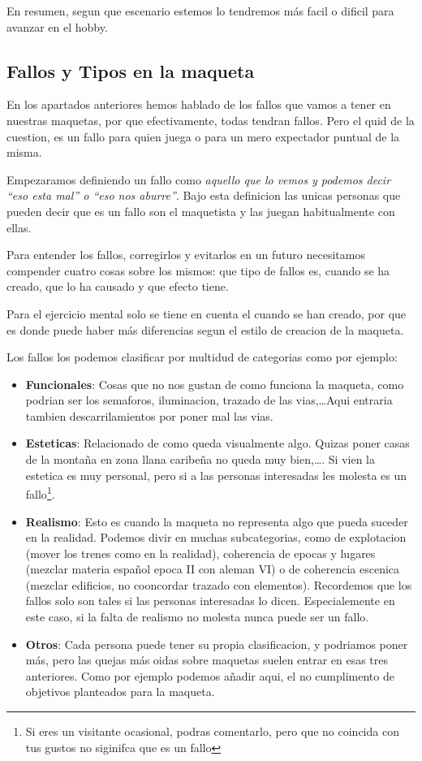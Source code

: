 En resumen, segun que escenario estemos lo tendremos más facil o dificil para avanzar en el hobby.

\subsection{Fallos y Tipos en la maqueta}
En los apartados anteriores hemos hablado de los fallos que vamos a tener en nuestras maquetas, por que efectivamente, todas tendran fallos. Pero el quid de la cuestion, es un fallo para quien juega o para un mero expectador puntual de la misma. 

Empezaramos definiendo un fallo como \emph{aquello que lo vemos y podemos decir ``eso esta mal'' o ``eso nos aburre''}. Bajo esta definicion las unicas personas que pueden decir que es un fallo son el maquetista y las juegan habitualmente con ellas. 

Para entender los fallos, corregirlos y evitarlos en un futuro necesitamos compender cuatro cosas sobre los mismos: que tipo de fallos es, cuando se ha creado, que lo ha causado y que efecto tiene. 

Para el ejercicio mental solo se tiene en cuenta el cuando se han creado, por que es donde puede haber más diferencias segun el estilo de creacion de la maqueta.

Los fallos los podemos clasificar por multidud de categorias como por ejemplo:
\begin{itemize}
	\item \textbf{Funcionales}: Cosas que no nos gustan de como funciona la maqueta, como podrian ser los semaforos, iluminacion, trazado de las vias,\dots Aqui entraria tambien descarrilamientos por poner mal las vias.
	\item \textbf{Esteticas}: Relacionado de como queda visualmente algo. Quizas poner casas de la montaña en zona llana caribeña no queda muy bien,\dots. Si vien la estetica es muy personal, pero si a las personas interesadas les molesta es un fallo\footnote{Si eres un visitante ocasional, podras comentarlo, pero que no coincida con tus gustos no siginifca que es un fallo}.
	\item \textbf{Realismo}: Esto es cuando la maqueta no representa algo que pueda suceder en la realidad. Podemos divir en muchas subcategorias, como de explotacion (mover los trenes como en la realidad), coherencia de epocas y lugares (mezclar materia español epoca II con aleman VI) o de coherencia escenica (mezclar edificios, no cooncordar trazado con elementos). Recordemos que los fallos solo son tales si las personas interesadas lo dicen. Especialemente en este caso, si la falta de realismo no molesta nunca puede ser un fallo. 
	
	\item \textbf{Otros}: Cada persona puede tener su propia clasificacion, y podriamos poner más, pero las quejas más oidas sobre maquetas suelen entrar en esas tres anteriores. Como por ejemplo podemos añadir aqui, el no cumplimento de objetivos planteados para la maqueta.
\end{itemize}

